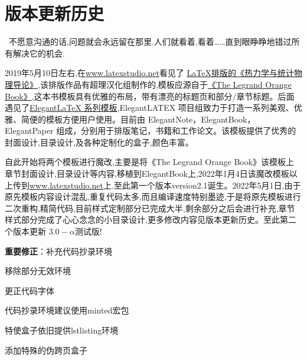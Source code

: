 \chapter{版本更新历史}
\begin{center}
\textcolor[RGB]{255, 0, 0}{\faHeart}~不愿意沟通的话,问题就会永远留在那里.人们就看着,看着……直到眼睁睁地错过所有解决它的机会.~\textcolor[RGB]{255, 0, 0}{\faHeart}
\end{center}
\begin{center}
\end{center}

2019年5月10日左右,在\href{latexstudio论坛}{www.latexstudio.net}看见了
\href{https://www.latexstudio.net/archives/10715.html}{LaTeX排版的《热力学与统计物理导论》},该排版作品有超理汉化组制作的,模板应源自于\href{http://www.latextemplates.com/template/the-legrand-orange-book}{《The Legrand Orange Book》},这本书模板具有优雅的布局，带有漂亮的标题页和部分/章节标题。后面遇见了\href{https://elegantlatex.org/}{Elegant\LaTeX{} 系列模板},ElegantLATEX 项目组致力于打造一系列美观、优雅、简便的模板方便用户使用。目前由
ElegantNote，ElegantBook，ElegantPaper 组成，分别用于排版笔记，书籍和工作论文。该模板提供了优秀的封面设计,目录设计,及各种定制化的盒子,颜色丰富。

自此开始将两个模板进行魔改,主要是将《The Legrand Orange Book》该模板上章节封面设计,目录设计等内容,移植到ElegantBook上,2022年1月4日该魔改模板以上传到\href{latexstudio论坛}{www.latexstudio.net}上.至此第一个版本version2.1诞生。2022年5月1日,由于原先模板内容设计混乱,重复代码太多,而且编译速度特别墨迹,于是将原先模板进行二次重构,精简代码,目前样式定制部分已完成大半,剩余部分之后会进行补充,章节样式部分完成了心心念念的小目录设计,更多修改内容见版本更新历史。至此第二个版本更新
$3.0-\alpha$测试版!


\begin{change}
    \item \textbf{重要修正}：补充代码抄录环境
    \item 移除部分无效环境
    \item 更正代码字体
    \item 代码抄录环境建议使用minted宏包
    \item 特使盒子依旧提供lstlisting环境
    \item 添加特殊的伪跨页盒子
\end{change}



